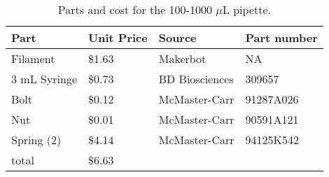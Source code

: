 \documentclass{nature}
\begin{document}
\begin{table}
\centering
\caption{Parts and cost for the 100-1000 $\mu$L pipette.}
\label{table2}
\medskip
\begin{tabular}{|l|l|l|l|}
\hline
Part         & Unit Price & Source         & Part number \\ \hline
Filament     & \$1.63     & Makerbot       & NA          \\ \hline
3 mL Syringe & \$0.73     & BD Biosciences & 309657      \\ \hline
Bolt         & \$0.12     & McMaster-Carr  & 91287A026   \\ \hline
Nut          & \$0.01     & McMaster-Carr  & 90591A121   \\ \hline
Spring (2)   & \$4.14     & McMaster-Carr  & 94125K542   \\ \hline
total        & \$6.63     &                &             \\ \hline
\end{tabular}
\end{table}
\end{document}
